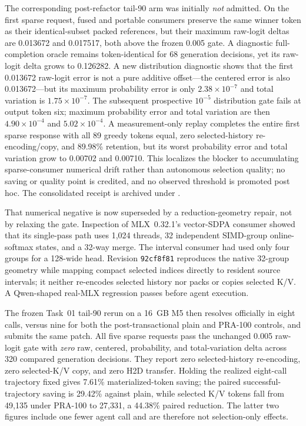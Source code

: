 \documentclass[11pt]{article}
\begin{document}
The corresponding post-refactor tail-90 arm was initially \emph{not} admitted.  On the
first sparse request, fused and portable consumers preserve the same winner
token as their identical-subset packed references, but their maximum raw-logit
deltas are 0.013672 and 0.017517, both above the frozen 0.005 gate.  A diagnostic
full-completion oracle remains token-identical for 68 generation decisions,
yet its raw-logit delta grows to 0.126282.  A new distribution diagnostic shows
that the first 0.013672 raw-logit error is not a pure additive offset---the
centered error is also 0.013672---but its maximum probability error is only
$2.38\times10^{-7}$ and total variation is $1.75\times10^{-7}$.  The subsequent
prospective $10^{-5}$ distribution gate fails at output token six; maximum
probability error and total variation are then $4.90\times10^{-4}$ and
$5.02\times10^{-4}$.  A measurement-only replay completes the entire first
sparse response with all 89 greedy tokens equal, zero selected-history
re-encoding/copy, and 89.98\% retention, but its worst probability error and
total variation grow to 0.00702 and 0.00710.  This localizes the blocker to
accumulating sparse-consumer numerical drift rather than autonomous selection
quality; no saving or quality point is credited, and no observed threshold is
promoted post hoc.  The consolidated receipt is archived under
.

That numerical negative is now superseded by a reduction-geometry repair,
not by relaxing the gate.  Inspection of MLX~0.32.1's vector-SDPA consumer
showed that its single-pass path uses 1,024 threads, 32 independent SIMD-group
online-softmax states, and a 32-way merge.  The interval consumer had used only
four groups for a 128-wide head.  Revision \texttt{92cf8f81} reproduces the
native 32-group geometry while mapping compact selected indices directly to
resident source intervals; it neither re-encodes selected history nor packs or
copies selected K/V.  A Qwen-shaped real-MLX regression passes before agent
execution.

The frozen Task~01 tail-90 rerun on a 16~GB M5 then resolves officially in
eight calls, versus nine for both the post-transactional plain and PRA-100
controls, and submits the same patch.  All five sparse requests pass the
unchanged 0.005 raw-logit gate with \emph{zero} raw, centered, probability, and
total-variation delta across 320 compared generation decisions.  They report
zero selected-history re-encoding, zero selected-K/V copy, and zero H2D
transfer.  Holding the realized eight-call trajectory fixed gives 7.61\%
materialized-token saving; the paired successful-trajectory saving is 29.42\%
against plain, while selected K/V tokens fall from 49,135 under PRA-100 to
27,331, a 44.38\% paired reduction.  The latter two figures include one fewer
agent call and are therefore not selection-only effects.
\end{document}
